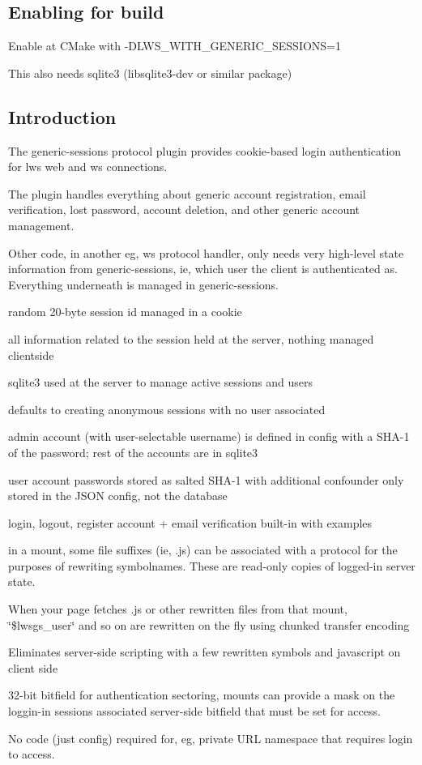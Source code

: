 \subsection*{Enabling for build }

Enable at C\+Make with -\/\+D\+L\+W\+S\+\_\+\+W\+I\+T\+H\+\_\+\+G\+E\+N\+E\+R\+I\+C\+\_\+\+S\+E\+S\+S\+I\+O\+NS=1

This also needs sqlite3 (libsqlite3-\/dev or similar package)

\subsection*{Introduction }

The generic-\/sessions protocol plugin provides cookie-\/based login authentication for lws web and ws connections.

The plugin handles everything about generic account registration, email verification, lost password, account deletion, and other generic account management.

Other code, in another eg, ws protocol handler, only needs very high-\/level state information from generic-\/sessions, ie, which user the client is authenticated as. Everything underneath is managed in generic-\/sessions.


\begin{DoxyItemize}
\item random 20-\/byte session id managed in a cookie
\item all information related to the session held at the server, nothing managed clientside
\item sqlite3 used at the server to manage active sessions and users
\item defaults to creating anonymous sessions with no user associated
\item admin account (with user-\/selectable username) is defined in config with a S\+H\+A-\/1 of the password; rest of the accounts are in sqlite3
\item user account passwords stored as salted S\+H\+A-\/1 with additional confounder only stored in the J\+S\+ON config, not the database
\item login, logout, register account + email verification built-\/in with examples
\item in a mount, some file suffixes (ie, .js) can be associated with a protocol for the purposes of rewriting symbolnames. These are read-\/only copies of logged-\/in server state.
\item When your page fetches .js or other rewritten files from that mount, \char`\"{}\$lwsgs\+\_\+user\char`\"{} and so on are rewritten on the fly using chunked transfer encoding
\item Eliminates server-\/side scripting with a few rewritten symbols and javascript on client side
\item 32-\/bit bitfield for authentication sectoring, mounts can provide a mask on the loggin-\/in session\textquotesingle{}s associated server-\/side bitfield that must be set for access.
\item No code (just config) required for, eg, private U\+RL namespace that requires login to access.
\end{DoxyItemize}

